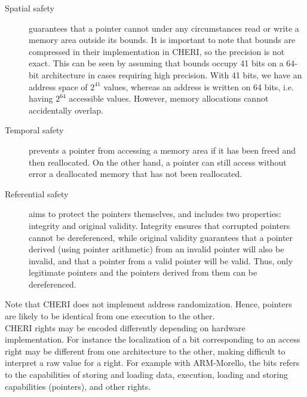 \documentclass[a4paper, 11pt]{article}
\begin{document}
\begin{description}
	\item[Spatial safety] guarantees that a pointer cannot under any circumstances read or write a memory area outside its bounds. It is important to note that bounds are compressed in their implementation in CHERI, so the precision is not exact. 
	This can be seen by assuming that bounds occupy 41 bits on a 64-bit architecture in cases requiring high precision.
	With 41 bits, we have an address space of $2^{41}$ values, whereas an address is written on 64 bits, i.e. having $2^{64}$ accessible values. However, memory allocations cannot accidentally overlap.
	\item[Temporal safety] prevents a pointer from accessing a memory area if it has been freed and then reallocated. On the other hand, a pointer can still access without error a deallocated memory that has not been reallocated.
	\item[Referential safety] aims to protect the pointers themselves, and includes two properties: integrity and original validity. Integrity ensures that corrupted pointers cannot be dereferenced, while original validity guarantees that a pointer derived (using pointer arithmetic) from an invalid pointer will also be invalid, and that a pointer from a valid pointer will be valid. Thus, only legitimate pointers and the pointers derived from them can be dereferenced.
\end{description}
Note that CHERI does not implement address randomization. Hence, pointers are likely to be identical from one execution to the other.\\
CHERI rights may be encoded differently depending on hardware implementation. For instance the localization of a bit corresponding to an access right may be different from one architecture to the other, making difficult to interpret a raw value for a right. For example with ARM-Morello, the bits refers to the capabilities of storing and loading data, execution, loading and storing capabilities (pointers), and other rights. 
\end{document}
